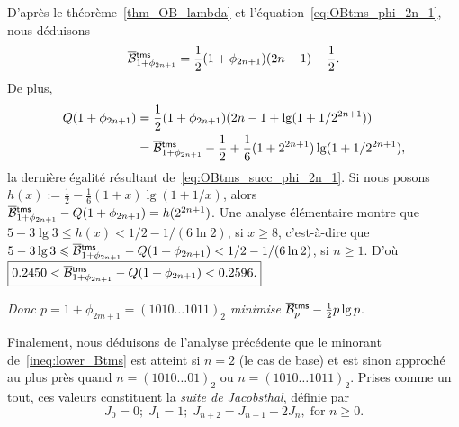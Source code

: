 \begin{itemize}
    D'après le théorème~\ref{thm_OB_lambda} et
    l'équation~\eqref{eq:OBtms_phi_2n_1}, nous déduisons
    \begin{equation}
      \OB{\fun{tms}}{1+\phi_{2n+1}} = \frac{1}{2}(1+\phi_{2n+1})(2n - 1)
      + \frac{1}{2}.
      \label{eq:OBtms_succ_phi_2n_1}
    \end{equation}
    De plus,
    \begin{align*}
      Q(1+\phi_{2n+1}) &= \frac{1}{2}(1+\phi_{2n+1})(2n-1 + \lg(1+1/2^{2n+1}))\\
                      &= \OB{\fun{tms}}{1+\phi_{2n+1}} - \frac{1}{2}
                         + \frac{1}{6}(1+2^{2n+1})\lg(1+1/2^{2n+1}),
    \end{align*}
    la dernière égalité résultant
    de~\eqref{eq:OBtms_succ_phi_2n_1}. Si nous posons \(h(x) :=
    \tfrac{1}{2} - \tfrac{1}{6}(1+x)\lg(1+1/x)\), alors
    \(\OB{\fun{tms}}{1+\phi_{2n+1}} - Q(1+\phi_{2n+1}) =
    h(2^{2n+1})\). Une analyse élémentaire montre que \(5 - 3\lg 3
    \leqslant h(x) < 1/2 - 1/(6\ln 2)\), si \(x \geqslant 8\),
    c'est-à-dire que \(5 - 3\lg 3 \leqslant
    \OB{\fun{tms}}{1+\phi_{2n+1}} - Q(1+\phi_{2n+1}) < 1/2 - 1/(6\ln
    2)\), si \(n \geqslant 1\). D'où \(\boxed{0.2450 <
      \OB{\fun{tms}}{1+\phi_{2n+1}} - Q(1+\phi_{2n+1}) < 0.2596.}\)

  \bigskip
  \textsl{Donc \(p = 1+\phi_{2m+1} = (1010\dots1011)_2\) minimise
  \(\OB{\fun{tms}}{p} - \tfrac{1}{2}p\lg p\).}

\end{itemize}

\bigskip

Finalement, nous déduisons de l'analyse précédente que le minorant
de~\eqref{ineq:lower_Btms} est atteint si \(n=2\) (le cas de base) et
est sinon approché au plus près quand \(n=(1010\dots01)_2\) ou
\(n=(1010\dots1011)_2\). Prises comme un tout, ces valeurs constituent
la \emph{suite de Jacobsthal},
définie par
\begin{equation}
J_0 = 0; \; J_1=1; \; J_{n+2} = J_{n+1} + 2J_{n},\; \text{for \(n
  \geqslant 0\).}
\label{eq:Jacobsthal}
\end{equation}

